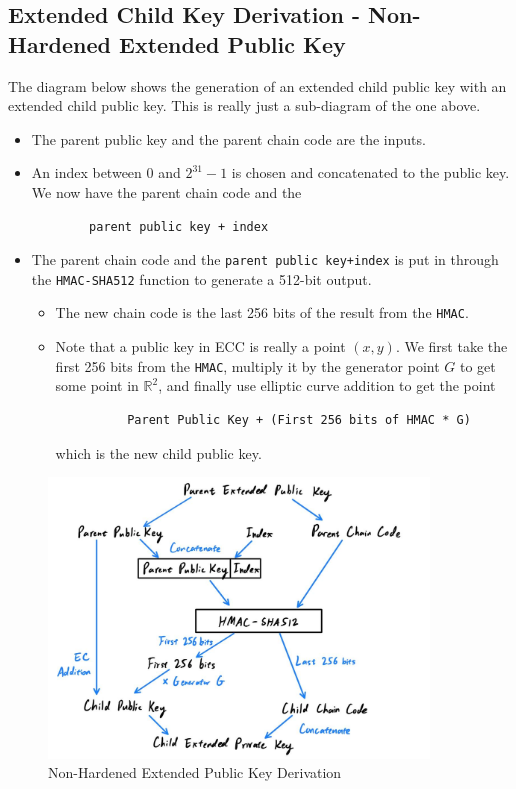 \documentclass{article}
\begin{document}
  \subsection{Extended Child Key Derivation - Non-Hardened Extended Public Key}

    The diagram below shows the generation of an extended child public key with an extended child public key. This is really just a sub-diagram of the one above.

    \begin{itemize}
      \item The parent public key and the parent chain code are the inputs.
      \item An index between $0$ and $2^{31}-1$ is chosen and concatenated to the public key. We now have the parent chain code and the
      \begin{lstlisting}
        parent public key + index
      \end{lstlisting}
      \item The parent chain code and the \texttt{parent public key+index} is put in through the \texttt{HMAC-SHA512} function to generate a 512-bit output.
      \begin{itemize}
        \item The new chain code is the last 256 bits of the result from the \texttt{HMAC}.
        \item Note that a public key in ECC is really a point $(x, y)$. We first take the first 256 bits from the \texttt{HMAC}, multiply it by the generator point $G$ to get some point in $\mathbb{R}^2$, and finally use elliptic curve addition to get the point
        \begin{lstlisting}
          Parent Public Key + (First 256 bits of HMAC * G)
        \end{lstlisting}
        which is the new child public key.
      \end{itemize}
    \end{itemize}

    \begin{figure}[H]
    \centering
    \includegraphics[width=0.9\textwidth]{img/Public_CKD.jpg}
    \caption{Non-Hardened Extended Public Key Derivation}
    \end{figure}
\end{document}
